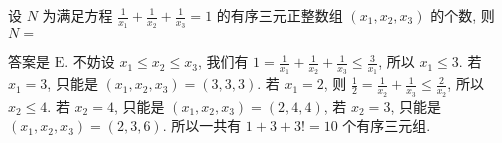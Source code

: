 \begin{prob}
\label{prob:prob-2}
设 $N$ 为满足方程 $\frac{1}{x_1} + \frac{1}{x_2} + \frac{1}{x_3} = 1$
的有序三元正整数组 $(x_1,x_2,x_3)$ 的个数, 则 $N = $
\end{prob}

\begin{soln}
答案是 $\boxed{\text{E}.}$
不妨设 $x_1 \le x_2 \le x_3$,
我们有 $1 = \frac{1}{x_1} + \frac{1}{x_2} + \frac{1}{x_3} \le \frac{3}{x_1}$,
所以 $x_1 \le 3$. 若 $x_1 = 3$, 只能是 $(x_1,x_2,x_3) = (3,3,3)$.
若 $x_1 = 2$, 则 $\frac{1}{2} = \frac{1}{x_2} + \frac{1}{x_3} \le \frac{2}{x_2}$,
所以 $x_2 \le 4$. 若 $x_2 = 4$, 只能是 $(x_1,x_2,x_3) = (2,4,4)$,
若 $x_2 = 3$, 只能是 $(x_1,x_2,x_3) = (2,3,6)$.
所以一共有 $1 + 3 + 3! = 10$ 个有序三元组.
\end{soln}

